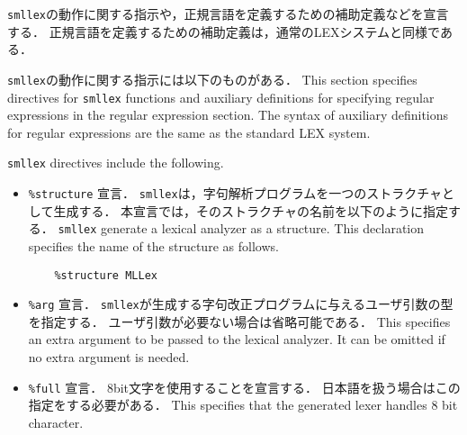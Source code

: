 \documentclass{jbook}
\newcommand{\txt}[2]{#2}
\newcommand{\code}[1]{\mbox{\large\tt #1}}
\begin{document}
\begin{enumerate}
\ifjp%
	\code{smllex}の動作に関する指示や，正規言語を定義するための補助定義などを宣言する．
	正規言語を定義するための補助定義は，通常のLEXシステムと同様である．

	\code{smllex}の動作に関する指示には以下のものがある．
\else%
	This section specifies directives for \code{smllex} functions
and auxiliary definitions for specifying regular expressions in the
regular expression section.
	The syntax of auxiliary definitions for regular expressions are the same as 
the standard LEX system.
	
	\code{smllex} directives include the following.
\fi%

\begin{itemize}
\item \verb|%structure| \txt{declareation}{宣言}．
\ifjp%
	\code{smllex}は，字句解析プログラムを一つのストラクチャとして生成する．
	本宣言では，そのストラクチャの名前を以下のように指定する．
\else%
	\code{smllex} generate a lexical analyzer as a structure.
	This declaration specifies the name of the structure as follows.
\fi%
\begin{verbatim}
    %structure MLLex
\end{verbatim}

\item \verb|%arg| \txt{declareation}{宣言}．
\ifjp%
	\code{smllex}が生成する字句改正プログラムに与えるユーザ引数の型を指定する．
	ユーザ引数が必要ない場合は省略可能である．
\else%
	This specifies an extra argument to be passed to the lexical analyzer.
	It can be omitted if no extra argument is needed.
\fi%

\item \verb|%full| \txt{declareation}{宣言}．
\ifjp%
	8bit文字を使用することを宣言する．
	日本語を扱う場合はこの指定をする必要がある．
\else%
	This specifies that the generated lexer handles 8 bit character.
\fi%


\end{itemize}
\end{enumerate}
\end{document}
